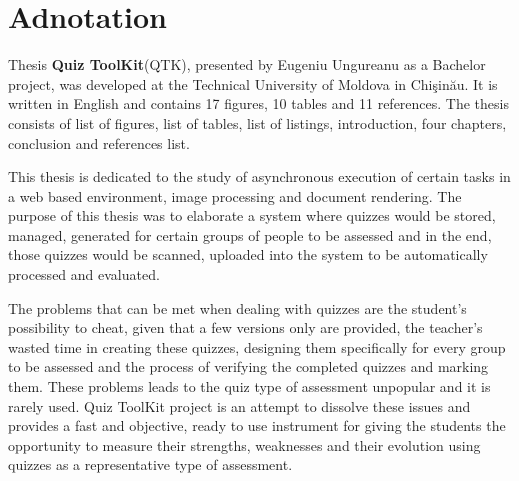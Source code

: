 \section*{Adnotation}

Thesis {\bf Quiz ToolKit}(QTK), presented by Eugeniu Ungureanu as a Bachelor project, was developed at the Technical University of Moldova in Chi\c{s}in\u{a}u. It is written in English and contains 17 figures, 10 tables and 11 references. The thesis consists of list of figures, list of tables, list of listings, introduction, four chapters, conclusion and references list.

This thesis is dedicated to the study of asynchronous execution of certain tasks in a web based environment, image processing and document rendering. The purpose of this thesis was to elaborate a system where quizzes would be stored, managed, generated for certain groups of people to be assessed and in the end, those quizzes would be scanned, uploaded into the system to be automatically processed and evaluated.

The problems that can be met when dealing with quizzes are the student's possibility to cheat, given that a few versions only are provided, the teacher's wasted time in creating these quizzes, designing them specifically for every group to be assessed and the process of verifying the completed quizzes and marking them. These problems leads to the quiz type of assessment unpopular and it is rarely used. Quiz ToolKit project is an attempt to dissolve these issues and provides a fast and objective, ready to use instrument for giving the students the opportunity to measure their strengths, weaknesses and their evolution using quizzes as a representative type of assessment.  

